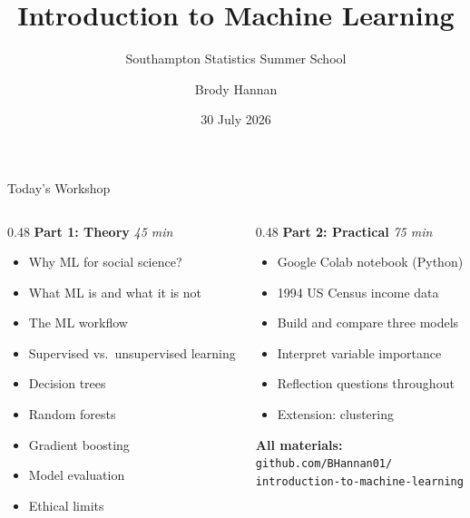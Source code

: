 \documentclass[aspectratio=169, 10pt]{beamer}
\title{Introduction to Machine Learning}
\subtitle{Southampton Statistics Summer School}
\author{Brody Hannan}
\institute{University of Southampton}
\date{30 July 2026}
\begin{document}
\maketitle

\begin{frame}{Today's Workshop}
\begin{columns}[T]
\begin{column}{0.48\textwidth}
\textbf{Part 1: Theory} \hfill \textcolor{sotongold}{\textit{45 min}}
\begin{itemize}
  \setlength\itemsep{0.4em}
  \item Why ML for social science?
  \item What ML is and what it is not
  \item The ML workflow
  \item Supervised vs.\ unsupervised learning
  \item Decision trees
  \item Random forests
  \item Gradient boosting
  \item Model evaluation
  \item Ethical limits
\end{itemize}
\end{column}

\begin{column}{0.48\textwidth}
\textbf{Part 2: Practical} \hfill \textcolor{sotongold}{\textit{75 min}}
\begin{itemize}
  \setlength\itemsep{0.4em}
  \item Google Colab notebook (Python)
  \item 1994 US Census income data
  \item Build and compare three models
  \item Interpret variable importance
  \item Reflection questions throughout
  \item Extension: clustering
\end{itemize}

\vspace{1.2em}
\small
\textbf{All materials:}\\
\texttt{github.com/BHannan01/}\\
\texttt{introduction-to-machine-learning}
\end{column}
\end{columns}
\end{frame}
\end{document}
